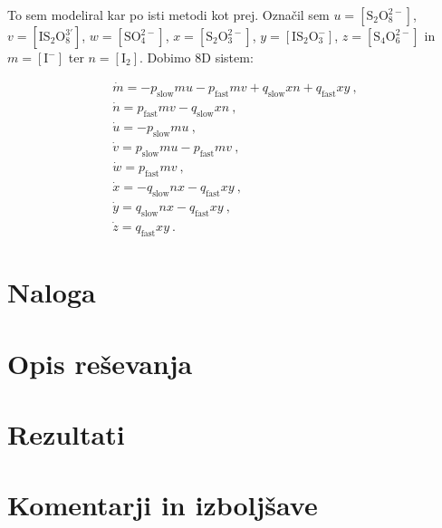 \documentclass[a4paper]{article}
\begin{document}
To sem modeliral kar po isti metodi kot prej. Označil sem $u = [\mathrm{S}_2\mathrm{O}_8^{2-}]$,
$v = [\mathrm{I}\mathrm{S}_2\mathrm{O}_8^{3'}]$, $w = [\mathrm{S}\mathrm{O}_4^{2-}]$,
$x = [\mathrm{S}_2\mathrm{O}_3^{2-}]$, $y = [\mathrm{I}\mathrm{S}_2\mathrm{O}_3^{-}]$, $z = [\mathrm{S}_4\mathrm{O}_6^{2-}]$
in $m = [\mathrm{I}^-]$ ter $n = [\mathrm{I}_2]$. Dobimo 8D sistem:

\begin{gather}
    \dot{m} = - p_\mathrm{slow}mu - p_\mathrm{fast}mv + q_\mathrm{slow}xn + q_\mathrm{fast}xy\>,\\
    \dot{n} = p_\mathrm{fast}mv - q_\mathrm{slow}xn\>,\\
    \dot{u} = - p_\mathrm{slow}mu\>,\\
    \dot{v} = p_\mathrm{slow}mu - p_\mathrm{fast}mv\>,\\
    \dot{w} = p_\mathrm{fast}mv\>,\\
    \dot{x} = - q_\mathrm{slow}nx - q_\mathrm{fast}xy\>,\\
    \dot{y} = q_\mathrm{slow}nx - q_\mathrm{fast}xy\>,\\
    \dot{z} = q_\mathrm{fast}xy\>.
\end{gather}


\section{Naloga}

\section{Opis reševanja}

\section{Rezultati}


\section{Komentarji in izboljšave}

\newpage


\end{document}
